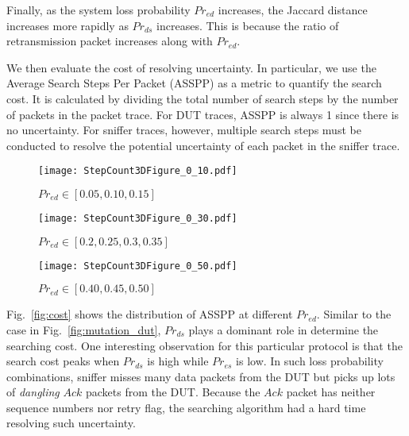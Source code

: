 Finally, as the system loss probability $Pr_{ed}$ increases, the Jaccard
distance increases more rapidly as $Pr_{ds}$ increases.  This is because the
ratio of retransmission packet increases along with $Pr_{ed}$.


We then evaluate the cost of resolving uncertainty. In particular, we use
the Average Search Steps Per Packet (ASSPP) as a metric to quantify the search
cost.  It is calculated by dividing the total number of search steps by the
number of packets in the packet trace. For DUT traces, ASSPP is always 1 since
there is no uncertainty. For sniffer traces, however, multiple search steps must
be conducted to resolve the potential uncertainty of each packet in the
sniffer trace.

\begin{figure*}[t!]
  \centering
  \begin{subfigure}{0.33\textwidth}
    \centering
    \texttt{[image: StepCount3DFigure\_0\_10.pdf]}
    \caption{$Pr_{ed} \in [0.05, 0.10, 0.15]$}
  \end{subfigure}\hspace*{0.01\textwidth}
  \begin{subfigure}{0.33\textwidth}
    \centering
    \texttt{[image: StepCount3DFigure\_0\_30.pdf]}
    \caption{$Pr_{ed} \in [0.2, 0.25, 0.3, 0.35]$}
  \end{subfigure}\hspace*{0.01\textwidth}
  \begin{subfigure}{0.33\textwidth}
    \centering
    \texttt{[image: StepCount3DFigure\_0\_50.pdf]}
    \caption{$Pr_{ed} \in [0.40, 0.45, 0.50]$}
  \end{subfigure}
  \caption{\textbf{Average Searching Step Per Packet.} For each data point, the mean of 5 runs
  is used.}
  \label{fig:cost}
\end{figure*}


Fig.~\ref{fig:cost} shows the distribution of ASSPP at different $Pr_{ed}$.
Similar to the case in Fig.~\ref{fig:mutation_dut}, $Pr_{ds}$ plays a dominant
role in determine the searching cost. One interesting observation for this
particular protocol is that the
search cost peaks when $Pr_{ds}$ is high while $Pr_{es}$ is low. In such loss
probability combinations, sniffer misses many data packets from the DUT but
picks up lots of \textit{dangling} $Ack$ packets from the DUT. Because the $Ack$
packet has neither sequence numbers nor retry flag, the searching algorithm had
a hard time resolving such uncertainty.

